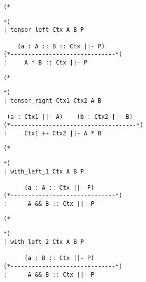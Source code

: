 \documentclass{article}
\theoremstyle{definition}
\begin{document}
\noindent\begin{minipage}{\textwidth}
\begin{verbatim}
(*
\end{verbatim}
\begin{center}\usebox{\tensorL}\end{center}
\begin{verbatim}
*)
| tensor_left Ctx A B P

    (a : A :: B :: Ctx ||- P)
(*------------------------------*)
:     A * B :: Ctx ||- P
\end{verbatim}
\end{minipage}

\noindent\begin{minipage}{\textwidth}
\begin{verbatim}
(*
\end{verbatim}
\begin{center}\usebox{\tensorR}\end{center}
\begin{verbatim}
*)
| tensor_right Ctx1 Ctx2 A B

 (a : Ctx1 ||- A)    (b : Ctx2 ||- B)
(*------------------------------------*)
:     Ctx1 ++ Ctx2 ||- A * B

\end{verbatim}
\end{minipage}

\noindent\begin{minipage}{\textwidth}
\begin{verbatim}
(*
\end{verbatim}
\begin{center}\usebox{\withLA}\end{center}
\begin{verbatim}
*)
| with_left_1 Ctx A B P

      (a : A :: Ctx ||- P)
(*------------------------------*) 
:      A && B :: Ctx ||- P 

\end{verbatim}
\end{minipage}

\noindent\begin{minipage}{\textwidth}
\begin{verbatim}
(*
\end{verbatim}
\begin{center}\usebox{\withLB}\end{center}
\begin{verbatim}
*)
| with_left_2 Ctx A B P

      (a : B :: Ctx ||- P)
(*------------------------------*) 
:      A && B :: Ctx ||- P 


\end{verbatim}
\end{minipage}
\end{document}
